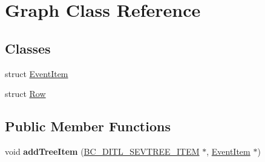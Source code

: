 \hypertarget{class_graph}{}\section{Graph Class Reference}
\label{class_graph}
\subsection*{Classes}
\begin{DoxyCompactItemize}
\item 
struct \hyperlink{struct_graph_1_1_event_item}{Event\+Item}
\item 
struct \hyperlink{struct_graph_1_1_row}{Row}
\end{DoxyCompactItemize}
\subsection*{Public Member Functions}
\begin{DoxyCompactItemize}
\item 
void {\bfseries add\+Tree\+Item} (\hyperlink{class_b_c___d_i_t_l___s_e_v_t_r_e_e___i_t_e_m}{B\+C\+\_\+\+D\+I\+T\+L\+\_\+\+S\+E\+V\+T\+R\+E\+E\+\_\+\+I\+T\+EM} $\ast$, \hyperlink{struct_graph_1_1_event_item}{Event\+Item} $\ast$)\hypertarget{class_graph_a25b4748477c4de42374689e738beb7cd}{}\label{class_graph_a25b4748477c4de42374689e738beb7cd}

\end{DoxyCompactItemize}
